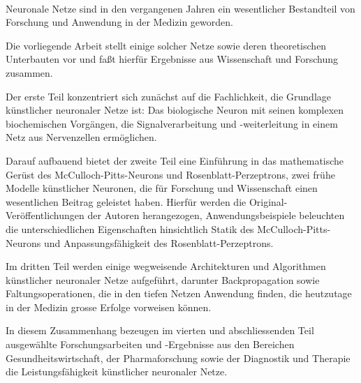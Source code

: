 \kurzfassung

\paragraph*{}

Neuronale Netze sind in den vergangenen Jahren ein wesentlicher Bestandteil von Forschung und Anwendung in der Medizin geworden.

Die vorliegende Arbeit stellt einige solcher Netze sowie deren theoretischen Unterbauten vor und faßt hierfür Ergebnisse aus Wissenschaft und Forschung zusammen.

Der erste Teil konzentriert sich zunächst auf die Fachlichkeit, die Grundlage künstlicher neuronaler Netze ist: Das biologische Neuron mit seinen komplexen biochemischen Vorgängen, die Signalverarbeitung und -weiterleitung in einem Netz aus Nervenzellen ermöglichen.

Darauf aufbauend bietet der zweite Teil eine Einführung in das mathematische Gerüst des McCulloch-Pitts-Neurons und Rosenblatt-Perzeptrons, zwei frühe Modelle künstlicher Neuronen, die für Forschung und Wissenschaft einen wesentlichen Beitrag geleistet haben.
Hierfür werden die Original-Veröffentlichungen der Autoren herangezogen, Anwendungsbeispiele beleuchten die unterschiedlichen Eigenschaften hinsichtlich Statik des McCulloch-Pitts-Neurons und Anpassungsfähigkeit des Rosenblatt-Perzeptrons.

Im dritten Teil werden einige wegweisende Architekturen und Algorithmen künstlicher neuronaler Netze aufgeführt, darunter Backpropagation sowie Faltungsoperationen, die in den tiefen Netzen Anwendung finden, die heutzutage in der Medizin grosse Erfolge vorweisen können.

In diesem Zusammenhang bezeugen im vierten und abschliessenden Teil ausgewählte Forschungsarbeiten und -Ergebnisse aus den Bereichen Gesundheitswirtschaft, der Pharmaforschung sowie der Diagnostik und Therapie die Leistungsfähigkeit künstlicher neuronaler Netze.

